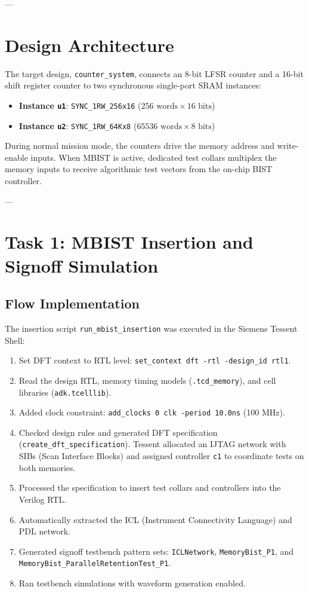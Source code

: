 \documentclass[12pt]{article}
\begin{document}
---

\section{Design Architecture}

The target design, \texttt{counter\_system}, connects an 8-bit LFSR counter and a 16-bit shift register counter to two synchronous single-port SRAM instances:
\begin{itemize}
    \item \textbf{Instance \texttt{u1}}: \texttt{SYNC\_1RW\_256x16} ($256 \text{ words} \times 16 \text{ bits}$)
    \item \textbf{Instance \texttt{u2}}: \texttt{SYNC\_1RW\_64Kx8} ($65536 \text{ words} \times 8 \text{ bits}$)
\end{itemize}

During normal mission mode, the counters drive the memory address and write-enable inputs. When MBIST is active, dedicated test collars multiplex the memory inputs to receive algorithmic test vectors from the on-chip BIST controller.

---

\section{Task 1: MBIST Insertion and Signoff Simulation}

\subsection{Flow Implementation}
The insertion script \texttt{run\_mbist\_insertion} was executed in the Siemens Tessent Shell:
\begin{enumerate}
    \item Set DFT context to RTL level: \texttt{set\_context dft -rtl -design\_id rtl1}.
    \item Read the design RTL, memory timing models (\texttt{.tcd\_memory}), and cell libraries (\texttt{adk.tcelllib}).
    \item Added clock constraint: \texttt{add\_clocks 0 clk -period 10.0ns} (100 MHz).
    \item Checked design rules and generated DFT specification (\texttt{create\_dft\_specification}). Tessent allocated an IJTAG network with SIBs (Scan Interface Blocks) and assigned controller \texttt{c1} to coordinate tests on both memories.
    \item Processed the specification to insert test collars and controllers into the Verilog RTL.
    \item Automatically extracted the ICL (Instrument Connectivity Language) and PDL network.
    \item Generated signoff testbench pattern sets: \texttt{ICLNetwork}, \texttt{MemoryBist\_P1}, and \texttt{MemoryBist\_ParallelRetentionTest\_P1}.
    \item Ran testbench simulations with waveform generation enabled.
\end{enumerate}
\end{document}
